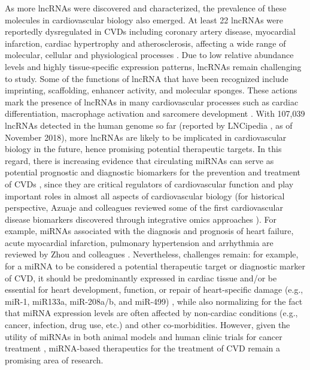 \documentclass[letter]{bib}
\newcounter{example}[subsection]
\begin{document}
	As more lncRNAs were discovered and characterized, the prevalence of these molecules in cardiovascular biology also emerged.
	At least 22 lncRNAs were reportedly dysregulated in CVDs including coronary artery disease, myocardial infarction, cardiac hypertrophy and atherosclerosis, affecting a wide range of molecular, cellular and physiological processes \citep{Das:2018:Deciphering, Xu:2018:Targeting}. Due to low relative abundance levels and highly tissue-specific expression patterns, lncRNAs remain challenging to study.
	Some of the functions of lncRNA that have been recognized include imprinting, scaffolding, enhancer activity, and molecular sponges. These actions mark the presence of lncRNAs in many cardiovascular processes such as cardiac differentiation, macrophage activation and sarcomere development \citep{Sallam:2018:Long}. With 107,039 lncRNAs detected in the human genome so far (reported by LNCipedia \citep{Volders:2018:LNCipedia}, as of November 2018), more lncRNAs are likely to be implicated in cardiovascular biology in the future, hence promising potential therapeutic targets.  In this regard, there is increasing evidence that circulating miRNAs can serve as potential prognostic and diagnostic biomarkers for the prevention and treatment of CVDs \citep{Zhou:2018:miRNAs}, since they are critical regulators of cardiovascular function and play important roles in almost all aspects of cardiovascular biology \citep{Elia:2009:Reciprocal,Marques:2011:Gene,Gupta:2016:Preclinical,Barwari:2016:MicroRNAs} (for historical perspective, Azuaje and colleagues reviewed some of the first cardiovascular disease biomarkers discovered through integrative omics approaches \citep{Azuaje:2009:Computational}).  For example, miRNAs associated with the diagnosis and prognosis of heart failure, acute myocardial infarction, pulmonary hypertension and arrhythmia are reviewed by Zhou and colleagues \citep{Zhou:2018:miRNAs}.  Nevertheless, challenges remain: for example, for a miRNA to be considered a potential therapeutic target or diagnostic marker of CVD, it should be predominantly expressed in cardiac tissue and/or be essential for heart development, function, or repair of heart-specific damage (e.g., miR-1, miR133a, miR-208a/b, and miR-499) \citep{Yu:2016:Deregulated,Chistiakov:2016:Cardiac-specific}, while also normalizing for the fact that miRNA expression levels are often affected by non-cardiac conditions (e.g., cancer, infection, drug use, etc.) and other co-morbidities.  However, given the utility of miRNAs in both animal models and human clinic trials for cancer treatment \citep{Lujambio:2012:The,Tyagi:2016:Exploiting,Drusco:2017:MicroRNAs,Catela:2017:microRNAs}, miRNA-based therapeutics for the treatment of CVD remain a promising area of research.    
\end{document}
